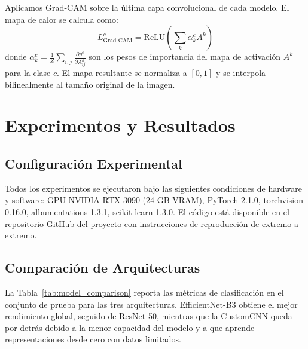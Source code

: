 \documentclass{article}
\begin{document}
Aplicamos Grad-CAM \cite{selvaraju2017gradcam} sobre la última capa convolucional 
de cada modelo. El mapa de calor se calcula como:
\begin{equation}
  L_{\text{Grad-CAM}}^c = \text{ReLU}\!\left( \sum_k \alpha_k^c A^k \right)
  \label{eq:gradcam}
\end{equation}
donde $\alpha_k^c = \frac{1}{Z} \sum_{i,j} \frac{\partial y^c}{\partial A_{ij}^k}$ 
son los pesos de importancia del mapa de activación $A^k$ para la clase $c$. 
El mapa resultante se normaliza a $[0, 1]$ y se interpola bilinealmente al tamaño 
original de la imagen.

\section{Experimentos y Resultados}
\label{sec:experiments}

\subsection{Configuración Experimental}
\label{ssec:setup}

Todos los experimentos se ejecutaron bajo las siguientes condiciones de hardware y 
software: GPU NVIDIA RTX 3090 (24 GB VRAM), PyTorch 2.1.0, torchvision 0.16.0, 
albumentations 1.3.1, scikit-learn 1.3.0. El código está disponible en el repositorio 
GitHub del proyecto con instrucciones de reproducción de extremo a extremo.

\subsection{Comparación de Arquitecturas}
\label{ssec:comparison}

La Tabla~\ref{tab:model_comparison} reporta las métricas de clasificación en el 
conjunto de prueba para las tres arquitecturas. EfficientNet-B3 obtiene el mejor 
rendimiento global, seguido de ResNet-50, mientras que la CustomCNN queda por detrás 
debido a la menor capacidad del modelo y a que aprende representaciones desde cero con 
datos limitados.
\end{document}
